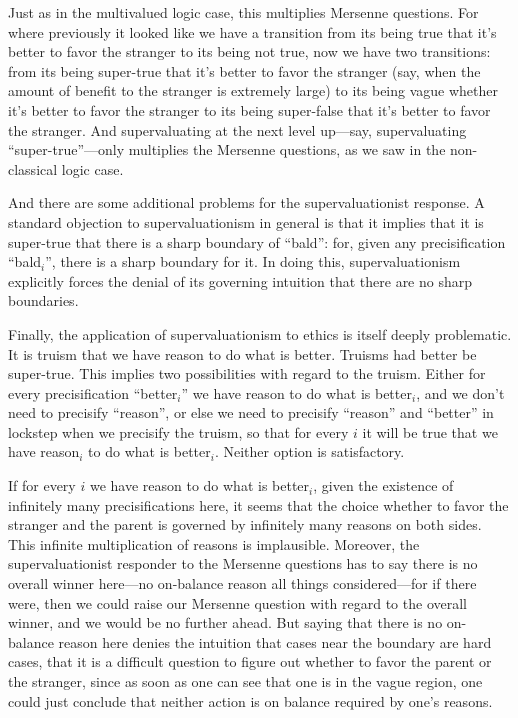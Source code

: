 Just as in the multivalued logic case, this multiplies Mersenne questions. For where previously it looked like we have a transition from its being true that it's better
to favor the stranger to its being not true, now we have two transitions: from its being super-true that it's better to favor the stranger (say, when the amount of
benefit to the stranger is extremely large) to its being vague whether it's better to favor the stranger to its being super-false that it's better to favor the stranger.
And supervaluating at the next level up---say, supervaluating ``super-true''---only multiplies the Mersenne questions, 
as we saw in the non-classical logic case.

And there are some additional problems for the supervaluationist response. A standard objection to supervaluationism in general is that it implies that it is
super-true that there is a sharp boundary of ``bald'': for, given any precisification ``bald$_i$'', there is a sharp boundary for it. In doing this, supervaluationism
explicitly forces the denial of its governing intuition that there are no sharp boundaries. 

Finally, the application of supervaluationism to ethics is itself deeply problematic. It is truism that we have reason to do what is better. Truisms had better be 
super-true. 
This implies two possibilities with regard to the truism.
Either for every precisification ``better$_i$'' we have reason to do what is better$_i$, and we don't need to 
precisify ``reason'', or else we need to precisify ``reason'' and ``better'' in lockstep
when we precisify the truism, so that for every $i$ it will be true that we have reason$_i$ to do what is better$_i$. Neither option is satisfactory.

If for every $i$ we have reason to do what is better$_i$, given the existence of infinitely many precisifications here, it seems that the choice whether to
favor the stranger and the parent is governed by infinitely many reasons on both sides. This infinite multiplication of reasons is implausible. Moreover, the supervaluationist responder to the Mersenne questions has to say there is 
no overall winner here---no on-balance reason all things considered---for if
there were, then we could raise our Mersenne question with regard to the overall winner, and we would be no further ahead. But saying that there is no on-balance reason
here denies the intuition that cases near the boundary are hard cases, that it is a difficult question to figure out whether to favor the parent or the stranger, since
as soon as one can see that one is in the vague region, one could just conclude that neither action is on balance required by one's reasons. 


